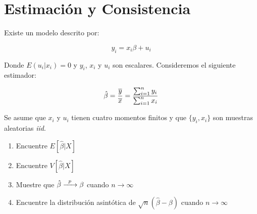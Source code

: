 \documentclass{exam}
\begin{document}
\section{Estimación y Consistencia}
Existe un modelo descrito por:

$$y_i = x_i \beta + u_i$$

Donde $E(u_i|x_i) = 0$ y $y_i$, $x_i$ y $u_i$ son escalares. Consideremos el siguiente estimador:

$$\Hat{\beta} = \frac{\overline{y}}{\overline{x}} = \frac{\sum_{i=1}^n y_i}{\sum_{i=1}^n x_i}$$

Se asume que $x_i$ y $u_i$ tienen cuatro momentos finitos y que $\{y_i,x_i\}$ son muestras aleatorias \textit{iid}.

\begin{enumerate}
    \item Encuentre $E[\hat{\beta}|X]$
    \item Encuentre $V[\hat{\beta}|X]$
    \item Muestre que $\hat{\beta} \xrightarrow{\enskip p\enskip} \beta$ cuando $n \longrightarrow \infty$
    \item Encuentre la distribución asintótica de $\sqrt{n}(\hat{\beta} - \beta)$ cuando $n \longrightarrow \infty$
\end{enumerate}
\end{document}
